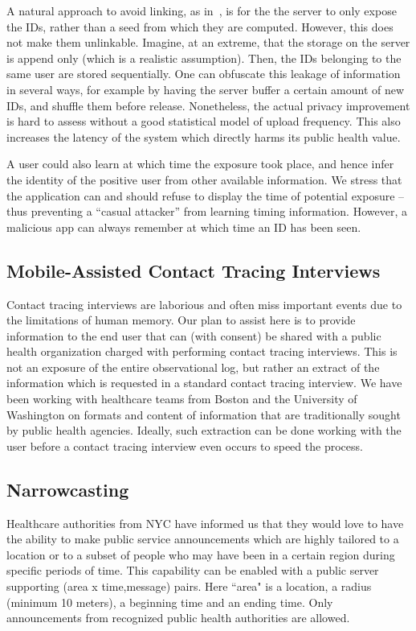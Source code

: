 \documentclass{article}
\begin{document}
A natural approach to avoid linking, as in~\cite{BU}, is for the the server to only expose the IDs, rather than a seed from which they are computed. However, this does not make them unlinkable. Imagine, at an extreme, that the storage on the server is append only (which is a realistic assumption). Then, the IDs belonging to the same user are stored sequentially. One can obfuscate this leakage of information in several ways, for example by having the server buffer a certain amount of new IDs, and shuffle them before release. Nonetheless, the actual privacy improvement is hard to assess without a good statistical model of upload frequency. This also increases the latency of the system which directly harms its public health value.

A user could also learn at which time the exposure took place, and hence infer the identity of the positive user from other available information. We stress that the application can and should refuse to display the time of potential exposure -- thus preventing a ``casual attacker'' from learning timing information. However, a malicious app can always remember at which time an ID has been seen.


\subsection{Mobile-Assisted Contact Tracing Interviews} 
Contact tracing interviews are laborious and often miss important events due to the limitations of human memory.  Our plan to assist here is to provide information to the end user that can (with consent) be shared with a public health organization charged with performing contact tracing interviews.  This is not an exposure of the entire observational log, but rather an extract of the information which is requested in a standard contact tracing interview. We have been working with healthcare teams from Boston and the University of Washington on formats and content of information that are traditionally sought by public health agencies.  Ideally, such extraction can be done working with the user before a contact tracing interview even occurs to speed the process.

\subsection{Narrowcasting}

Healthcare authorities from NYC have informed us that they would love to have the ability to make public service announcements which are highly tailored to a location or to a subset of people who may have been in a certain region during specific periods of time.  This capability can be enabled with a public server supporting (area x time,message) pairs.  Here ``area" is a location, a radius (minimum 10 meters), a beginning time and an ending time.  Only announcements from recognized public health authorities are allowed.  
\end{document}
